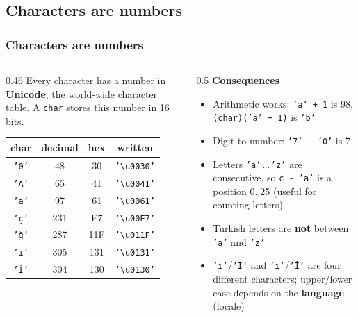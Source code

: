 \documentclass[aspectratio=169,10pt,compress]{beamer}
\begin{document}
\subsection[Numbers]{Characters are numbers}




\begin{frame}[t,fragile] \frametitle{Characters are numbers}
  \begin{columns}[T]
    \begin{column}{0.46\textwidth}
      \small Every character has a number in \textbf{Unicode}, the world-wide character table.
      A \texttt{char} stores this number in 16 bits.

      \vspace{0.4em}
      \begin{tabular}{@{}cccc@{}}
        \toprule
        \textbf{char} & \textbf{decimal} & \textbf{hex} & \textbf{written} \\
        \midrule
        \texttt{'0'} & 48  & 30  & \texttt{'\textbackslash u0030'} \\
        \texttt{'A'} & 65  & 41  & \texttt{'\textbackslash u0041'} \\
        \texttt{'a'} & 97  & 61  & \texttt{'\textbackslash u0061'} \\
        \texttt{'ç'} & 231 & E7  & \texttt{'\textbackslash u00E7'} \\
        \texttt{'ğ'} & 287 & 11F & \texttt{'\textbackslash u011F'} \\
        \texttt{'ı'} & 305 & 131 & \texttt{'\textbackslash u0131'} \\
        \texttt{'İ'} & 304 & 130 & \texttt{'\textbackslash u0130'} \\
        \bottomrule
      \end{tabular}
    \end{column}
    \begin{column}{0.5\textwidth}
      \textbf{Consequences}
      \begin{itemize}\small
        \item Arithmetic works: \texttt{'a' + 1} is 98, \texttt{(char)('a' + 1)} is \texttt{'b'}
        \item Digit to number: \texttt{'7' - '0'} is 7
        \item Letters \texttt{'a'..'z'} are consecutive, so \texttt{c - 'a'} is a position 0..25
              (useful for counting letters)
        \item Turkish letters are \textbf{not} between \texttt{'a'} and \texttt{'z'}
        \item \texttt{'i'}/\texttt{'I'} and \texttt{'ı'}/\texttt{'İ'} are four different characters;
              upper/lower case depends on the \textbf{language} (locale)
      \end{itemize}
    \end{column}
  \end{columns}
\end{frame}
\end{document}

